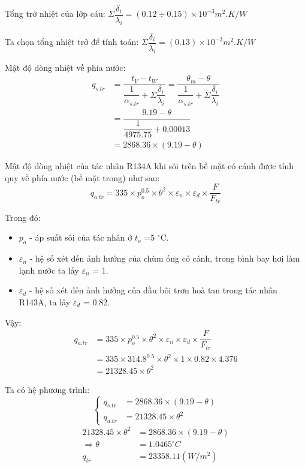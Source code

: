 Tổng trở nhiệt của lớp cáu:
$\Sigma \dfrac{\delta_{i}}{\lambda_{i}} = (0.12 \div 0.15)\times 10^{-3} m^2.K/W$

Ta chọn tổng nhiệt trở để tính toán: $\Sigma \dfrac{\delta_{i}}{\lambda_{i}} = (0.13)\times 10^{-3} m^2.K/W$

Mật độ dòng nhiệt về phía nước:
\begin{equation*}
	\begin{split}
		q_{s.tr} &= \dfrac{t_{V} - t_{W}}{\dfrac{1}{\alpha_{s.tr}} + \Sigma \dfrac{\delta_{i}}{\lambda_{i}}} = \dfrac{\theta_{m} - \theta}{\dfrac{1}{\alpha_{s.tr}} + \Sigma \dfrac{\delta_{i}}{\lambda_{i}}}\\
		&= \dfrac{9.19 - \theta}{\dfrac{1}{4975.75}+0.00013}\\
		&= 2868.36 \times (9.19 - \theta)
	\end{split}
\end{equation*}

Mật độ dòng nhiệt của tác nhân R134A khi sôi trên bề mặt có cánh được tính quy về phía nước (bề mặt trong) như sau:
\begin{equation*}
	q_{a.tr} = 335\times p_{o}^{0.5}\times\theta^2\times\varepsilon_{n}\times\varepsilon_{d}\times\dfrac{F}{F_{tr}}
\end{equation*}

\pagebreak
Trong đó:
\begin{itemize}
	\item $p_{o}$ - áp suất sôi của tác nhân ở $t_{o}$ =5 $^{\circ}$C.
	\item $\varepsilon_{n}$ - hệ số xét đến ảnh hưởng của chùm ống có cánh, trong bình bay hơi làm lạnh nước ta lấy $\varepsilon_{n}$ = 1.
	\item $\varepsilon_{d}$ - hệ số xét đến ảnh hưởng của dầu bôi trơn hoà tan trong tác nhân R143A, ta lấy $\varepsilon_{d}$ = 0.82.
\end{itemize}

Vậy:
\begin{equation*}
	\begin{split}
		q_{a.tr} &= 335\times p_{o}^{0.5}\times\theta^2\times\varepsilon_{n}\times\varepsilon_{d}\times\dfrac{F}{F_{tr}}\\
		&= 335 \times 314.8^{0.5} \times \theta^2 \times 1 \times 0.82 \times 4.376\\
		&= 21328.45 \times \theta^2
	\end{split}
\end{equation*}

Ta có hệ phương trình:
\begin{equation*}
	\begin{cases}
		q_{s.tr} &= 2868.36\times(9.19 - \theta)\\
		q_{a.tr} &= 21328.45\times\theta^2
	\end{cases}
\end{equation*}
\begin{equation*}
	\begin{split}
		21328.45\times\theta^2 &= 2868.36\times(9.19 - \theta)\\
		\Rightarrow \theta &= 1.0465^{\circ}C\\
		q_{tr} &=23358.11(W/m^2)
	\end{split}
\end{equation*}

